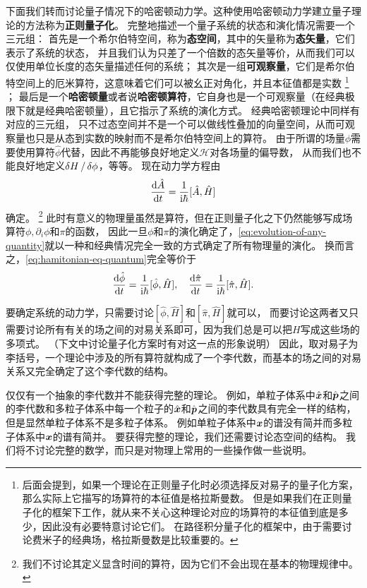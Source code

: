 \documentclass[hyperref, UTF8, a4paper]{ctexart}
\newcommand*{\ii}{\mathrm{i}}
\begin{document}
下面我们转而讨论量子情况下的哈密顿动力学。这种使用哈密顿动力学建立量子理论的方法称为\textbf{正则量子化}。
完整地描述一个量子系统的状态和演化情况需要一个三元组：
首先是一个希尔伯特空间，称为\textbf{态空间}，其中的矢量称为\textbf{态矢量}，它们表示了系统的状态，
并且我们认为只差了一个倍数的态矢量等价，从而我们可以仅使用单位长度的态矢量描述任何的系统；
其次是一组\textbf{可观察量}，它们是希尔伯特空间上的厄米算符，这意味着它们可以被幺正对角化，并且本征值都是实数%
\footnote{后面会提到，如果一个理论在正则量子化时必须选择反对易子的量子化方案，那么实际上它描写的场算符的本征值是格拉斯曼数。
但是如果我们在正则量子化的框架下工作，就从来不关心这种理论对应的场算符的本征值到底是多少，因此没有必要特意讨论它们。
在路径积分量子化的框架中，由于需要讨论费米子的经典场，格拉斯曼数是比较重要的。}%
；
最后是一个\textbf{哈密顿量}或者说\textbf{哈密顿算符}，它自身也是一个可观察量（在经典极限下就是经典哈密顿量），且它指示了系统的演化方式。
经典哈密顿理论中同样有对应的三元组，
只不过态空间并不是一个可以做线性叠加的向量空间，从而可观察量也只是从态到实数的映射而不是希尔伯特空间上的算符。
由于所谓的场量$\phi$需要使用算符$\hat{\phi}$代替，因此不再能够良好地定义$\mathcal{H}$对各场量的偏导数，
从而我们也不能良好地定义$\var{H}/\var{\phi}$，等等。
现在动力学方程由
\begin{equation}
    \dv{\hat{A}}{t} = \frac{1}{\ii \hbar} [\hat{A}, \hat{H}]
    \label{eq:quantum-evolution}
\end{equation}
确定。%
\footnote{我们不讨论其定义显含时间的算符，因为它们不会出现在基本的物理规律中。}%
此时有意义的物理量虽然是算符，但在正则量子化之下仍然能够写成场算符$\phi, \partial_i \phi$和$\pi$的函数，
因此一旦$\phi$和$\pi$的演化确定了，\eqref{eq:evolution-of-any-quantity}就以一种和经典情况完全一致的方式确定了所有物理量的演化。
换而言之，\eqref{eq:hamitonian-eq-quantum}完全等价于
\begin{equation}
    \dv{\hat{\phi}}{t} = \frac{1}{\ii \hbar} [\hat{\phi}, \hat{H}], 
    \quad \dv{\hat{\pi}}{t} = \frac{1}{\ii \hbar} [\hat{\pi}, \hat{H}].
    \label{eq:hamitonian-eq-quantum}
\end{equation}

要确定系统的动力学，只需要讨论$[\hat{\phi}, \hat{H}]$和$[\hat{\pi}, \hat{H}]$就可以，
而要讨论这两者又只需要讨论所有有关的场之间的对易关系即可，因为我们总是可以把$H$写成这些场的多项式。
（下文中讨论量子化方案时有对这一点的形象说明）
因此，取对易子为李括号，一个理论中涉及的所有算符就构成了一个李代数，而基本的场之间的对易关系又完全确定了这个李代数的结构。

仅仅有一个抽象的李代数并不能获得完整的理论。
例如，单粒子体系中$\hat{\vb*{x}}$和$\hat{\vb*{p}}$之间的李代数和多粒子体系中每一个粒子的$\hat{\vb*{x}}$和$\hat{\vb*{p}}$之间的李代数具有完全一样的结构，但是显然单粒子体系不是多粒子体系。
例如单粒子体系中$\vb*{x}$的谱没有简并而多粒子体系中$\vb*{x}$的谱有简并。
要获得完整的理论，我们还需要讨论态空间的结构。
我们将不讨论完整的数学，而只是对物理上常用的一些操作做一些说明。
\end{document}
